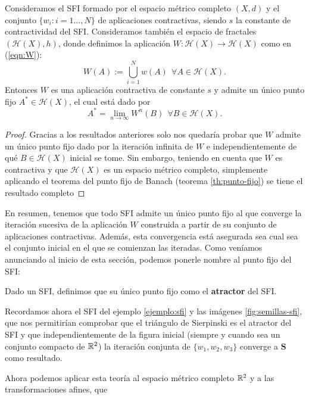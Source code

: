 \begin{teorema}
    Consideramos el SFI formado por el espacio métrico completo $(X,d)$ y el conjunto $\{w_i:i=1\dots, N\}$ de aplicaciones contractivas, siendo $s$ la constante de contractividad del SFI. Consideramos también el espacio de fractales $(\mathcal{H}(X),h)$, donde definimos la aplicación $W:\mathcal{H}(X)\longrightarrow\mathcal{H}(X)$ como en (\ref{eqn:W}):
    $$
    W(A) := \bigcup_{i=1}^N w(A) \ \ \forall A\in\mathcal{H}(X).
    $$
    Entonces $W$ es una aplicación contractiva de constante $s$ y admite un único punto fijo $A^*\in\mathcal{H}(X)$, el cual está dado por 
    $$
    A^*=\lim_{n\rightarrow\infty} W^n(B) \ \ \forall B\in\mathcal{H}(X).
    $$

\end{teorema}
\begin{proof}
    Gracias a los resultados anteriores solo nos quedaría probar que $W$ admite un único punto fijo dado por la iteración infinita de $W$ e independientemente de qué $B\in\mathcal{H}(X)$ inicial se tome. Sin embargo, teniendo en cuenta que $W$ es contractiva y que $\mathcal{H}(X)$ es un espacio métrico completo, simplemente aplicando el teorema del punto fijo de Banach (teorema \ref{th:punto-fijo}) se tiene el resultado completo
\end{proof}

En resumen, tenemos que todo SFI admite un único punto fijo al que converge la iteración sucesiva de la aplicación $W$ construida a partir de su conjunto de aplicaciones contractivas. Además, esta convergencia está asegurada sea cual sea el conjunto inicial en el que se comienzan las iteradas. Como veníamos anunciando al inicio de esta sección, podemos ponerle nombre al punto fijo del SFI:

\begin{definicion}[Atractor]
    Dado un SFI, definimos que su único punto fijo como el \textbf{atractor} del SFI.    
\end{definicion}

Recordamos ahora el SFI del ejemplo \ref{ejemplo:sfi} y las imágenes \ref{fig:semillas-sfi}, que nos permitirían comprobar que el triángulo de Sierpinski es el atractor del SFI y que independientemente de la figura inicial (siempre y cuando sea un conjunto compacto de $\mathbb{R}^2$) la iteración conjunta de $\{w_1,w_2,w_3\}$ converge a $\mathbf{S}$ como resultado.

Ahora podemos aplicar esta teoría al espacio métrico completo $\mathbb{R}^2$ y a las transformaciones afines, que